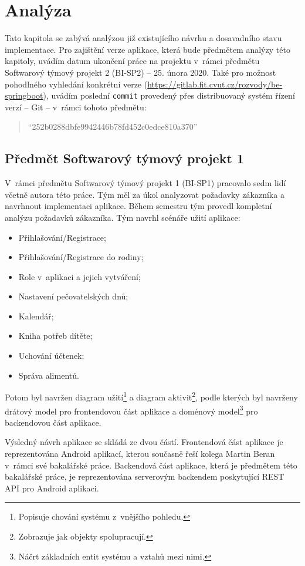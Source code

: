 \chapter{Analýza}\label{chapter:analyza}
Tato kapitola se zabývá analýzou již existujícího návrhu a dosavadního stavu implementace. Pro zajištění verze aplikace, která bude předmětem analýzy této kapitoly, uvádím datum ukončení práce na projektu v~rámci předmětu Softwarový týmový projekt 2 (BI-SP2) -- 25. února 2020. Také pro možnost pohodlného vyhledání konkrétní verze  (\url{https://gitlab.fit.cvut.cz/rozvody/be-springboot}), uvádím poslední \texttt{commit} provedený přes distribuovaný systém řízení verzí -- Git -- v~rámci tohoto předmětu: 
\begin{quote}
    \enquote{252b0288dbfe9942446b78fd452c0edce810a370}
\end{quote}

\section{Předmět Softwarový týmový projekt 1}\label{analyza:navrh:sp1}
    V~rámci předmětu Softwarový týmový projekt 1 (BI-SP1) pracovalo sedm lidí včetně autora této práce. Tým měl za úkol analyzovat požadavky zákazníka a navrhnout implementaci aplikace. Během semestru tým provedl kompletní analýzu požadavků zákazníka. Tým navrhl scénáře užití aplikace:
    \begin{itemize}
	   \item Přihlašování/Registrace;
	   \item Přihlašování/Registrace do rodiny;
	   \item Role v~aplikaci a jejich vytváření;
	   \item Nastavení pečovatelských dnů;
	   \item Kalendář;
	   \item Kniha potřeb dítěte;
	   \item Uchování účtenek;
	   \item Správa alimentů.
	\end{itemize}
    Potom byl navržen diagram užití\footnote{Popisuje chování systému z~vnějšího pohledu.} a diagram aktivit\footnote{Zobrazuje jak objekty spolupracují.}, podle kterých byl navrženy drátový model pro frontendovou část aplikace a doménový model\footnote{Náčrt základních entit systému a vztahů mezi nimi.} pro backendovou část aplikace. 
    
    Výsledný návrh aplikace se skládá ze dvou částí. Frontendová část aplikace je reprezentována Android aplikací, kterou současně řeší kolega Martin Beran v~rámci své bakalářské práce. Backendová část aplikace, která je předmětem této bakalářské práce, je reprezentována serverovým backendem poskytující REST API pro Android aplikaci.

